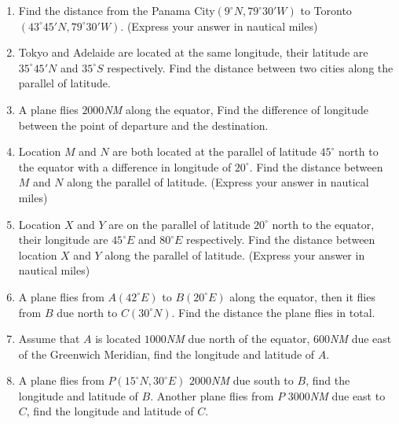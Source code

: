 \documentclass{report}
\begin{document}
\begin{multicols}{2}
\begin{enumerate}
\begin{center}
              \end{center}
        \item Find the distance from the Panama City$(9^\circ N, 79^\circ 30' W)$ to Toronto
              $(43^\circ 45' N, 79^\circ 30' W)$. (Express your answer in nautical miles)
        \item Tokyo and Adelaide are located at the same longitude, their latitude are
              $35^\circ 45' N$ and $35^\circ S$ respectively. Find the distance between two
              cities along the parallel of latitude.
        \item A plane flies $2000$\emph{NM} along the equator, Find the difference of
              longitude between the point of departure and the destination.
        \item Location $M$ and $N$ are both located at the parallel of latitude $45^\circ$
              north to the equator with a difference in longitude of $20^\circ$. Find the
              distance between $M$ and $N$ along the parallel of latitude. (Express your
              answer in nautical miles)
        \item Location $X$ and $Y$ are on the parallel of latitude $20^\circ$ north to the
              equator, their longitude are $45^\circ E$ and $80^\circ E$ respectively. Find
              the distance between location $X$ and $Y$ along the parallel of latitude.
              (Express your answer in nautical miles)
        \item A plane flies from $A(42^\circ E)$ to $B(20^\circ E)$ along the equator, then
              it flies from $B$ due north to $C(30^\circ N)$. Find the distance the plane
              flies in total.
        \item Assume that $A$ is located $1000$\emph{NM} due north of the equator,
              $600$\emph{NM} due east of the Greenwich Meridian, find the longitude and
              latitude of $A$.
        \item A plane flies from $P(15^\circ N, 30^\circ E)$ $2000$\emph{NM} due south to
              $B$, find the longitude and latitude of $B$. Another plane flies from $P$
              $3000$\emph{NM} due east to $C$, find the longitude and latitude of $C$.

\end{enumerate}
\end{multicols}
\end{document}
